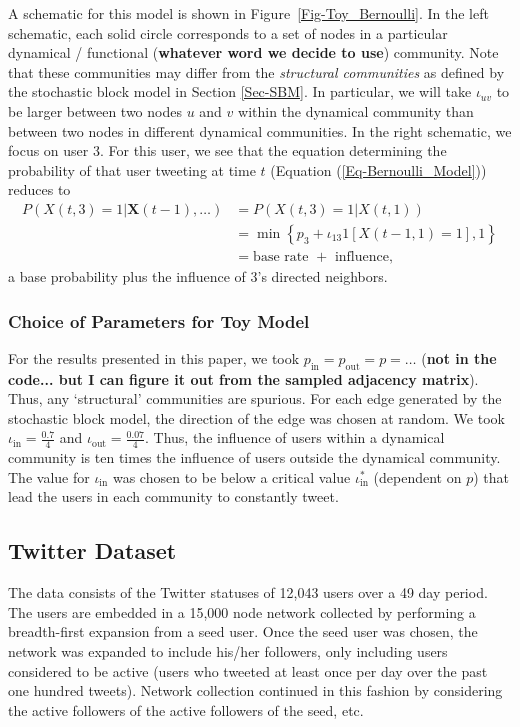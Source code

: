 \documentclass[12pt]{article}
\begin{document}
A schematic for this model is shown in Figure~\ref{Fig-Toy_Bernoulli}. In the left schematic, each solid circle corresponds to a set of nodes in a particular dynamical / functional (\textbf{whatever word we decide to use}) community. Note that these communities may differ from the \emph{structural communities} as defined by the stochastic block model in Section \ref{Sec-SBM}. In particular, we will take $\iota_{uv}$ to be larger between two nodes $u$ and $v$ within the dynamical community than between two nodes in different dynamical communities. In the right schematic, we focus on user 3. For this user, we see that the equation determining the probability of that user tweeting at time $t$ (Equation (\ref{Eq-Bernoulli_Model})) reduces to
\begin{align}
	P(X(t, 3) = 1 | \mathbf{X}(t-1), \ldots) &= P(X(t,3) = 1 | X(t, 1)) \\
		&= \min \left\{p_{3} + \iota_{13} 1[X(t-1, 1) = 1], 1\right\}\\
		&= \text{base rate } + \text{ influence,}
\end{align}
a base probability plus the influence of 3's directed neighbors.

\subsubsection{Choice of Parameters for Toy Model}

For the results presented in this paper, we took $p_{\text{in}} = p_{\text{out}} = p = \ldots$ (\textbf{not in the code... but I can figure it out from the sampled adjacency matrix}). Thus, any `structural' communities are spurious. For each edge generated by the stochastic block model, the direction of the edge was chosen at random. We took $\iota_{\text{in}} = \frac{0.7}{4}$ and $\iota_{\text{out}} = \frac{0.07}{4}$. Thus, the influence of users within a dynamical community is ten times the influence of users outside the dynamical community. The value for $\iota_{\text{in}}$ was chosen to be below a critical value $\iota^{*}_{\text{in}}$ (dependent on $p$) that lead the users in each community to constantly tweet.

\subsection{Twitter Dataset}

The data consists of the Twitter statuses of 12,043 users over a 49 day period. The users are embedded in a 15,000 node network collected by performing a breadth-first expansion from a seed user. Once the seed user was chosen, the network was expanded to include his/her followers, only including users considered to be active (users who tweeted at least once per day over the past one hundred tweets). Network collection continued in this fashion by considering the active followers of the active followers of the seed, etc.
\end{document}
